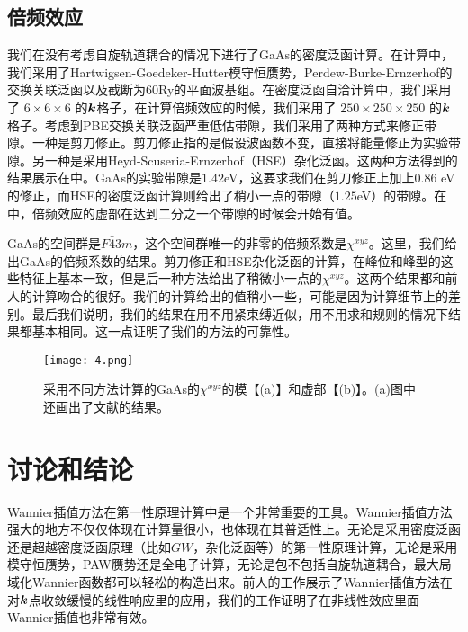 \subsection{倍频效应}


我们在没有考虑自旋轨道耦合的情况下进行了GaAs的密度泛函计算。在计算中，我们采用了Hartwigsen-Goedeker-Hutter模守恒赝势\cite{hartwigsen_relativistic_1998}，Perdew-Burke-Ernzerhof的交换关联泛函\cite{perdew_generalized_1996}以及截断为60Ry的平面波基组。在密度泛函自洽计算中，我们采用了 $6\times6\times6$ 的$\boldsymbol{k}$格子，在计算倍频效应的时候，我们采用了 $250\times250\times250$ 的$\boldsymbol{k}$格子。考虑到PBE交换关联泛函严重低估带隙，我们采用了两种方式来修正带隙。一种是剪刀修正\cite{nastos_scissors_2005}。剪刀修正指的是假设波函数不变，直接将能量修正为实验带隙。另一种是采用Heyd-Scuseria-Ernzerhof（HSE）杂化泛函\cite{heyd_hybrid_2003}。这两种方法得到的结果展示在中。GaAs的实验带隙是$1.42$eV，这要求我们在剪刀修正上加上$0.86$ eV的修正，而HSE的密度泛函计算则给出了稍小一点的带隙（$1.25$eV）的带隙。在中，倍频效应的虚部在达到二分之一个带隙的时候会开始有值。

GaAs的空间群是$F\bar{4}3m$，这个空间群唯一的非零的倍频系数是$\chi^{xyz}$。这里，我们给出GaAs的倍频系数的结果。剪刀修正和HSE杂化泛函的计算，在峰位和峰型的这些特征上基本一致，但是后一种方法给出了稍微小一点的$\chi^{xyz}$。这两个结果都和前人的计算吻合的很好\cite{rashkeev_efficient_1998,nastos_scissors_2005,hughes_calculation_1996}。我们的计算给出的值稍小一些，可能是因为计算细节上的差别。最后我们说明，我们的结果在用不用紧束缚近似，用不用求和规则的情况下结果都基本相同。这一点证明了我们的方法的可靠性。

\begin{figure}
	\begin{centering}
	\texttt{[image: 4.png]}
	\par\end{centering}
	\caption{\label{fig4} 采用不同方法计算的GaAs的$\chi^{xyz}$的模【(a)】和虚部【(b)】。(a)图中还画出了文献的结果。}
	\end{figure}
\section{讨论和结论\label{sec:discussions-and-conclusions}}


Wannier插值方法在第一性原理计算中是一个非常重要的工具。Wannier插值方法强大的地方不仅仅体现在计算量很小，也体现在其普适性上。无论是采用密度泛函还是超越密度泛函原理（比如$GW$，杂化泛函等）的第一性原理计算，无论是采用模守恒赝势，PAW赝势还是全电子计算，无论是包不包括自旋轨道耦合，最大局域化Wannier函数都可以轻松的构造出来。前人的工作展示了Wannier插值方法在对$\boldsymbol{k}$点收敛缓慢的线性响应里的应用，我们的工作证明了在非线性效应里面Wannier插值也非常有效。


